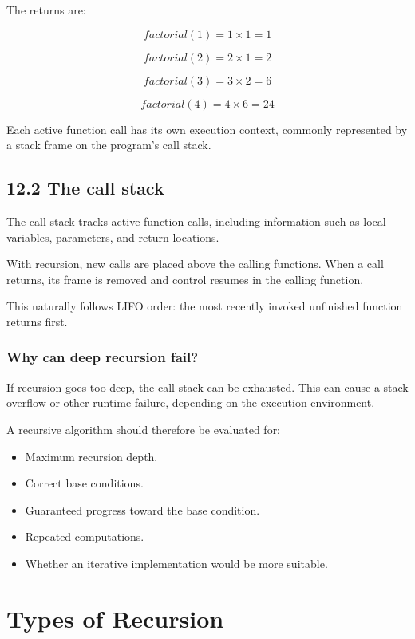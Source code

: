 The returns are:


\[
factorial(1)=1\times1=1
\]



\[
factorial(2)=2\times1=2
\]



\[
factorial(3)=3\times2=6
\]



\[
factorial(4)=4\times6=\boxed{24}
\]


Each active function call has its own execution context, commonly represented by a stack frame on the program's call stack.

\subsection{12.2 The call stack}

The call stack tracks active function calls, including information such as local variables, parameters, and return locations.

With recursion, new calls are placed above the calling functions. When a call returns, its frame is removed and control resumes in the calling function.

This naturally follows LIFO order: the most recently invoked unfinished function returns first.

\subsubsection{Why can deep recursion fail?}

If recursion goes too deep, the call stack can be exhausted. This can cause a stack overflow or other runtime failure, depending on the execution environment.

A recursive algorithm should therefore be evaluated for:

\begin{itemize}
    \item Maximum recursion depth.
    \item Correct base conditions.
    \item Guaranteed progress toward the base condition.
    \item Repeated computations.
    \item Whether an iterative implementation would be more suitable.
\end{itemize}

\section{Types of Recursion}

